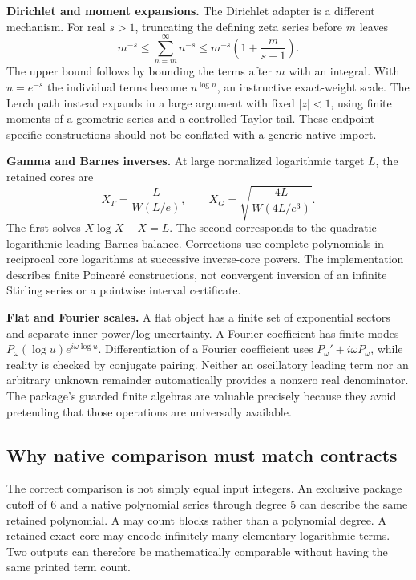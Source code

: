 \documentclass[11pt,a4paper]{article}
\newcommand{\code}[1]{\texttt{\detokenize{#1}}}
\begin{document}
\textbf{Dirichlet and moment expansions.} The Dirichlet adapter is a different mechanism. For real $s>1$, truncating the defining zeta series before $m$ leaves
\begin{equation}\label{eq:zeta-tail}
 m^{-s}\leq\sum_{n=m}^{\infty}n^{-s}
 \leq m^{-s}\left(1+\frac{m}{s-1}\right).
\end{equation}
The upper bound follows by bounding the terms after $m$ with an integral. With $u=e^{-s}$ the individual terms become $u^{\log n}$, an instructive exact-weight scale. The Lerch path instead expands in a large argument with fixed $|z|<1$, using finite moments of a geometric series and a controlled Taylor tail. These endpoint-specific constructions should not be conflated with a generic native import.\cite{dirichlet}

\textbf{Gamma and Barnes inverses.} At large normalized logarithmic target $L$, the retained cores are
\begin{equation}\label{eq:cores}
 X_{\Gamma}=\frac{L}{W(L/e)},\qquad
 X_G=\sqrt{\frac{4L}{W(4L/e^3)}}.
\end{equation}
The first solves $X\log X-X=L$. The second corresponds to the quadratic-logarithmic leading Barnes balance. Corrections use complete polynomials in reciprocal core logarithms at successive inverse-core powers. The implementation describes finite Poincar\'e constructions, not convergent inversion of an infinite Stirling series or a pointwise interval certificate.\cite{gamma}

\textbf{Flat and Fourier scales.} A flat object has a finite set of exponential sectors and separate inner power/log uncertainty. A Fourier coefficient has finite modes $P_\omega(\log u)e^{i\omega\log u}$. Differentiation of a Fourier coefficient uses $P_\omega'+i\omega P_\omega$, while reality is checked by conjugate pairing. Neither an oscillatory leading term nor an arbitrary unknown remainder automatically provides a nonzero real denominator. The package's guarded finite algebras are valuable precisely because they avoid pretending that those operations are universally available.\cite{flat,fourier}

\subsection{Why native comparison must match contracts}
The correct comparison is not simply equal input integers. An exclusive package cutoff of 6 and a native polynomial series through degree 5 can describe the same retained polynomial. A \code{SeriesTermGoal} may count blocks rather than a polynomial degree. A retained exact core may encode infinitely many elementary logarithmic terms. Two outputs can therefore be mathematically comparable without having the same printed term count.
\end{document}
